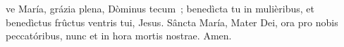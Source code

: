 ve María, grázia plena, Dòminus tecum~; benedìcta tu in mulièribus, et benedìctus frûctus ventris tui, Jesus. Sâncta María, Mater Dei, ora pro nobis peccatóribus, nunc et in hora mortis nostrae.
Amen.
